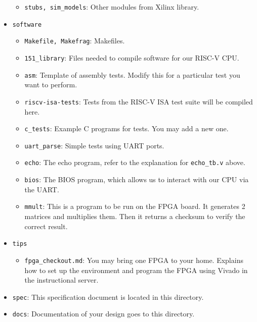 \begin{itemize}
\begin{itemize}
  \item \verb|stubs, sim_models|:
    Other modules from Xilinx library.
  \end{itemize}
\item \verb|software|
  \begin{itemize}
  \item \verb|Makefile, Makefrag|:
    Makefiles.
  \item \verb|151_library|:
    Files needed to compile software for our RISC-V CPU.
  \item \verb|asm|:
    Template of assembly tests.
    Modify this for a particular test you want to perform.
  \item \verb|riscv-isa-tests|:
    Tests from the RISC-V ISA test suite will be compiled here.
  \item \verb|c_tests|:
    Example C programs for tests.
    You may add a new one.
  \item \verb|uart_parse|:
    Simple tests using UART ports.
  \item \verb|echo|:
    The echo program, refer to the explanation for \verb|echo_tb.v| above.
  \item \verb|bios|:
    The BIOS program, which allows us to interact with our CPU via the UART.
  \item \verb|mmult|:
    This is a program to be run on the FPGA board.
    It generates 2 matrices and multiplies them.
    Then it returns a checksum to verify the correct result.
  \end{itemize}
\item \verb|tips|
  \begin{itemize}
  \item \verb|fpga_checkout.md|:
    You may bring one FPGA to your home.
    Explains how to set up the environment and program the FPGA using Vivado in the instructional server.
  \end{itemize}
\item \verb|spec|:
  This specification document is located in this directory.
\item \verb|docs|:
  Documentation of your design goes to this directory.
\end{itemize}

\newpage

